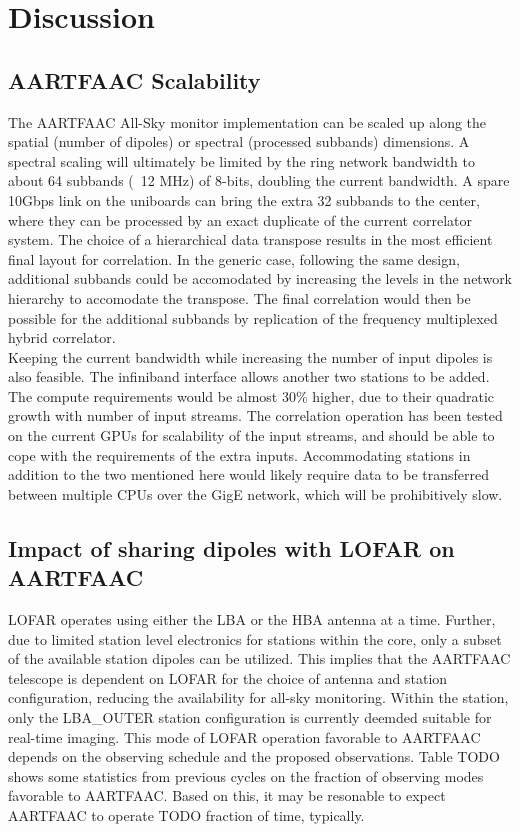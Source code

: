 \documentclass{ws-jai}
\begin{document}
\section {\label{sec:discussion} Discussion}
\subsection {AARTFAAC Scalability}
The AARTFAAC All-Sky  monitor implementation can be scaled up  along the spatial
(number  of dipoles)  or spectral  (processed subbands)  dimensions. A  spectral
scaling will  ultimately be limited  by the ring  network bandwidth to  about 64
subbands (~12  MHz) of 8-bits,  doubling the  current bandwidth. A  spare 10Gbps
link on the uniboards can bring the  extra 32 subbands to the center, where they
can be  processed by an  exact duplicate of  the current correlator  system. The
choice of  a hierarchical  data transpose  results in  the most  efficient final
layout  for  correlation.  In  the  generic case,  following  the  same  design,
additional subbands could be accomodated by increasing the levels in the network
hierarchy  to accomodate  the transpose.  The  final correlation  would then  be
possible for the additional subbands by replication of the frequency multiplexed
hybrid correlator.\\

Keeping the  current bandwidth while increasing  the number of input  dipoles is
also  feasible. The  infiniband  interface  allows another  two  stations to  be
added.  The compute  requirements  would be  almost 30\%  higher,  due to  their
quadratic growth  with number of  input streams.  The correlation  operation has
been tested on the current GPUs for scalability of the input streams, and should
be  able to  cope  with  the requirements  of  the  extra inputs.  Accommodating
stations in addition to  the two mentioned here would likely  require data to be
transferred  between  multiple  CPUs  over  the  GigE  network,  which  will  be
prohibitively slow.

\subsection {\label{subsec:impact_lofar} Impact of sharing dipoles with LOFAR on AARTFAAC}
LOFAR operates using either  the LBA or the HBA antenna at  a time. Further, due
to limited station level electronics for stations within the core, only a subset
of the available station dipoles can be utilized. This implies that the AARTFAAC
telescope  is  dependent  on  LOFAR  for  the  choice  of  antenna  and  station
configuration,  reducing the  availability  for all-sky  monitoring. Within  the
station, only the LBA\_OUTER station configuration is currently deemded suitable
for  real-time imaging.   This mode  of  LOFAR operation  favorable to  AARTFAAC
depends on  the observing  schedule and the  proposed observations.   Table TODO
shows some  statistics from previous cycles  on the fraction of  observing modes
favorable to AARTFAAC. Based on this, it  may be resonable to expect AARTFAAC to
operate TODO fraction of time, typically.
\end{document}
